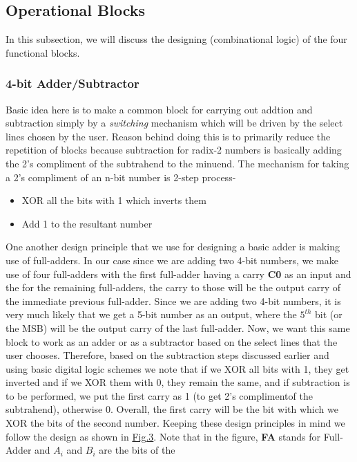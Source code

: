 \documentclass[a4paper, titlepage]{article}
\begin{document}
\subsection{Operational Blocks}
In this subsection, we will discuss the designing (combinational logic) of the four functional blocks.
\subsubsection{4-bit Adder/Subtractor}
Basic idea here is to make a common block for carrying out addtion and subtraction simply by a \textit{switching}
mechanism which will be driven by the select lines chosen by the user. Reason behind doing this is to primarily
reduce the repetition of blocks because subtraction for radix-2 numbers is basically adding the 2's compliment 
of the subtrahend to the minuend. \newline 
The mechanism for taking a 2's compliment of an n-bit number is 2-step process-
\begin{itemize}
    \item XOR all the bits with 1 which inverts them 
    \item Add 1 to the resultant number
\end{itemize}
One another design principle that we use for designing a basic adder is making use of full-adders. In our case 
since we are adding two 4-bit numbers, we make use of four full-adders with the first full-adder having a carry \textbf{C0}
as an input and the for the remaining full-adders, the carry to those will be the output carry of the immediate previous 
full-adder. Since we are adding two 4-bit numbers, it is very much likely that we get a 5-bit number as an output, where
the $5^{th}$ bit (or the MSB) will be the output carry of the last full-adder. \newline 
Now, we want this same block to work as an adder or as a subtractor based on the select lines that the user chooses. 
Therefore, based on the subtraction steps discussed earlier and using basic digital logic schemes
we note that if we XOR all bits with 1, they get inverted 
and if we XOR them with 0, they remain the same, and if subtraction is to be performed, we put the first carry as 1 (to get
2's complimentof the subtrahend), otherwise 0. Overall, the first carry will be the bit with which we XOR the bits of the
second number. \newline 
Keeping these design principles in mind we follow the design as shown in \hyperlink{4AS}{Fig.3}. 
Note that in the figure, \textbf{FA} stands for Full-Adder and $A_i$ and $B_i$ are the bits of the 
\end{document}
